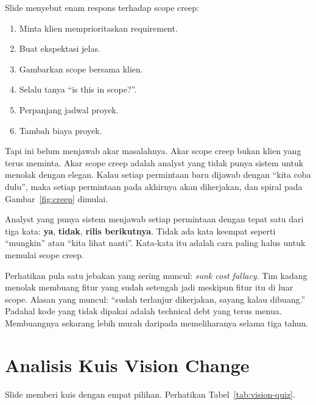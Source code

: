 \documentclass[11pt,a4paper]{article}
\begin{document}
Slide menyebut enam respons terhadap scope creep:
\begin{enumerate}
	\item Minta klien memprioritaskan requirement.
	\item Buat ekspektasi jelas.
	\item Gambarkan scope bersama klien.
	\item Selalu tanya ``is this in scope?''.
	\item Perpanjang jadwal proyek.
	\item Tambah biaya proyek.
\end{enumerate}

Tapi ini belum menjawab akar masalahnya. Akar scope creep bukan klien yang terus meminta. Akar scope creep adalah analyst yang tidak punya sistem untuk menolak dengan elegan. Kalau setiap permintaan baru dijawab dengan ``kita coba dulu'', maka setiap permintaan pada akhirnya akan dikerjakan, dan spiral pada Gambar~\ref{fig:creep} dimulai.

Analyst yang punya sistem menjawab setiap permintaan dengan tepat satu dari tiga kata: \textbf{ya}, \textbf{tidak}, \textbf{rilis berikutnya}. Tidak ada kata keempat seperti ``mungkin'' atau ``kita lihat nanti''. Kata-kata itu adalah cara paling halus untuk memulai scope creep.

Perhatikan pula satu jebakan yang sering muncul: \textit{sunk cost fallacy}. Tim kadang menolak membuang fitur yang sudah setengah jadi meskipun fitur itu di luar scope. Alasan yang muncul: ``sudah terlanjur dikerjakan, sayang kalau dibuang.'' Padahal kode yang tidak dipakai adalah technical debt yang terus menua. Membuangnya sekarang lebih murah daripada memeliharanya selama tiga tahun.

\section{Analisis Kuis Vision Change}

Slide memberi kuis dengan empat pilihan. Perhatikan Tabel~\ref{tab:vision-quiz}.
\end{document}
